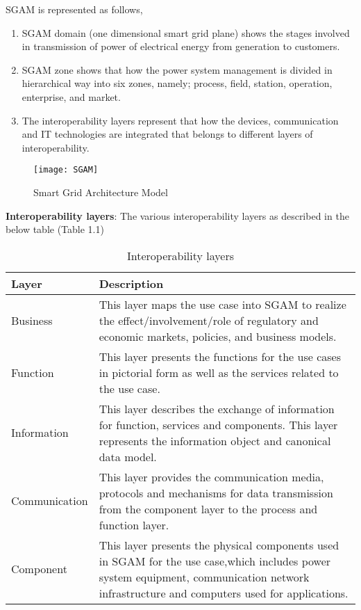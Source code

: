 SGAM is represented as follows,
\begin{enumerate}
  \item SGAM domain (one dimensional smart grid plane) shows the stages involved in
transmission of power of electrical energy from generation to customers.
  \item SGAM zone shows that how the power system management is divided in hierarchical
way into six zones, namely; process, field, station, operation, enterprise, and market.
  \item The interoperability layers represent that how the devices, communication and IT
technologies are integrated that belongs to different layers of interoperability.
\end{enumerate}
\begin{figure}[htb]
	\centering
	\texttt{[image: SGAM]}
	\caption{Smart Grid Architecture Model }
	\label{fig:Smart Grid Architecture Model }
\end{figure}

\textbf{Interoperability layers}: The various interoperability layers as described in the below table (Table 1.1)

\begin{table}[h!t]
	\begin{center}
	\begin{tabular} { | l | p{11cm} | }
    \hline
		\textbf{Layer} & \textbf{Description} \\ 
		\hline
		Business & This layer maps the use case into SGAM to realize the
effect/involvement/role of regulatory and economic markets, policies, and
business models. \\ 
		\hline
		Function & This layer presents the functions for the use cases in pictorial form as well as the services related to the use case. \\ 
        \hline
        Information & This layer describes the exchange of information for function, services and components. This layer represents the information object and
canonical data model. \\ 
		\hline
        Communication & This layer provides the communication media, protocols and mechanisms for data transmission from the component layer to the process and
function layer. \\ 
		\hline
        Component & This layer presents the physical components used in SGAM for the use case,which includes power system equipment, communication network
infrastructure and computers used for applications. \\ 
		\hline

	\end{tabular}
\end{center}
    \caption{Interoperability layers}
    \label{table:1} 
\end{table}

